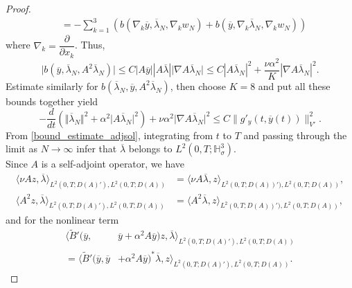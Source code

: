 \documentclass[reqno]{amsart}
\begin{document}
\begin{proof}
\begin{align*}
			&=-\sum_{k=1}^3 \left(b(\nabla_k \overline{y}, \overline{
				\lambda}_N,\nabla_k w_N) + b( \overline{y}, \nabla_k \overline{
				\lambda}_N,\nabla_k w_N) \right)
		\end{align*}
		where $\nabla_k =\dfrac{\partial}{\partial x_k}$. Thus, \[\vert b(\overline{y}, \overline{\lambda}_N, A^2\overline{\lambda}_N) \vert \leq C | A\overline{y} | |A\overline{\lambda}| \vert \nabla A\overline{\lambda}_N \vert \leq C|A\overline{\lambda}_N|^2 +\dfrac{\nu\alpha^2}{K}|\nabla A\overline{\lambda}_N|^2.\]
		Estimate similarly for $b(\overline{\lambda}_N,\overline{y}, A^2 \overline{\lambda}_N)$, then choose $K=8$ and put all these bounds together yield
		\begin{equation} \label{bound_estimate_adjsol}
			-\frac{d}{dt} \left(\Vert \overline{\lambda}_N \Vert^2 + \alpha^2 \vert A\overline{\lambda}_N \vert^2 \right)  + \nu\alpha^2\vert \nabla A \overline{\lambda}_N \vert^2 \leq C \| g'_y(t,\overline{y}(t)) \|^2_{V'}.
		\end{equation}
		From \eqref{bound_estimate_adjsol}, integrating from $t$ to $T$ and passing through the limit as $N \to \infty$ infer that $\overline{\lambda}$ belongs to $L^2(0,T;\mathbb{H}^3_\sigma)$.\\
		Since $A$ is a self-adjoint operator, we have 
		\begin{align}
			\langle \nu A z,\overline{\lambda} \rangle_{L^2(0,T;D(A)'),L^2(0,T;D(A))} &=  \langle \nu A \overline{\lambda},z \rangle_{L^2(0,T;D(A))'),L^2(0,T;D(A))}, \label{4.6}\\
			\langle A^2 z,\overline{\lambda} \rangle_{L^2(0,T;D(A)'),L^2(0,T;D(A))} &=  \langle A^2 \overline{\lambda},z \rangle_{L^2(0,T;D(A))'),L^2(0,T;D(A))}, \label{4.6a}
		\end{align}
		and for the nonlinear term
		\begin{equation}
			\begin{split}
				\langle \widetilde{B}'(\overline{y}, & \overline{y} +\alpha^2 A\overline{y})z,\overline{\lambda}  \rangle_{L^2(0,T;D(A)'), L^2(0,T;D(A))} \\
				= \langle \widetilde{B}'(\overline{y},\overline{y} &+\alpha^2 A\overline{y})^*\overline{\lambda},z\rangle_{L^2(0,T;D(A)'),L^2(0,T;D(A))}.  \label{4.7}
			\end{split}
		\end{equation}
		

\end{proof}
\end{document}

